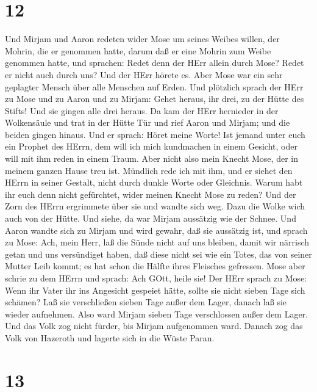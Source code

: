 \hypertarget{section-11}{%
\section{12}\label{section-11}}

 Und Mirjam und Aaron redeten wider Mose um seines Weibes
willen, der Mohrin, die er genommen hatte, darum daß er eine Mohrin zum
Weibe genommen hatte,  und sprachen: Redet denn der HErr
allein durch Mose? Redet er nicht auch durch uns? Und der HErr hörete
es.  Aber Mose war ein sehr geplagter Mensch über alle
Menschen auf Erden.  Und plötzlich sprach der HErr zu Mose
und zu Aaron und zu Mirjam: Gehet heraus, ihr drei, zu der Hütte des
Stifts! Und sie gingen alle drei heraus.  Da kam der HErr
hernieder in der Wolkensäule und trat in der Hütte Tür und rief Aaron
und Mirjam; und die beiden gingen hinaus.  Und er sprach:
Höret meine Worte! Ist jemand unter euch ein Prophet des HErrn, dem will
ich mich kundmachen in einem Gesicht, oder will mit ihm reden in einem
Traum.  Aber nicht also mein Knecht Mose, der in meinem
ganzen Hause treu ist.  Mündlich rede ich mit ihm, und er
siehet den HErrn in seiner Gestalt, nicht durch dunkle Worte oder
Gleichnis. Warum habt ihr euch denn nicht gefürchtet, wider meinen
Knecht Mose zu reden?  Und der Zorn des HErrn ergrimmete
über sie und wandte sich weg.  Dazu die Wolke wich auch von
der Hütte. Und siehe, da war Mirjam aussätzig wie der Schnee. Und Aaron
wandte sich zu Mirjam und wird gewahr, daß sie aussätzig ist,
 und sprach zu Mose: Ach, mein Herr, laß die Sünde nicht
auf uns bleiben, damit wir närrisch getan und uns versündiget haben,
 daß diese nicht sei wie ein Totes, das von seiner Mutter
Leib kommt; es hat schon die Hälfte ihres Fleisches gefressen.
 Mose aber schrie zu dem HErrn und sprach: Ach GOtt, heile
sie!  Der HErr sprach zu Mose: Wenn ihr Vater ihr ins
Angesicht gespeiet hätte, sollte sie nicht sieben Tage sich schämen? Laß
sie verschließen sieben Tage außer dem Lager, danach laß sie wieder
aufnehmen.  Also ward Mirjam sieben Tage verschlossen außer
dem Lager. Und das Volk zog nicht fürder, bis Mirjam aufgenommen ward.
 Danach zog das Volk von Hazeroth und lagerte sich in die
Wüste Paran.

\hypertarget{section-12}{%
\section{13}\label{section-12}}

